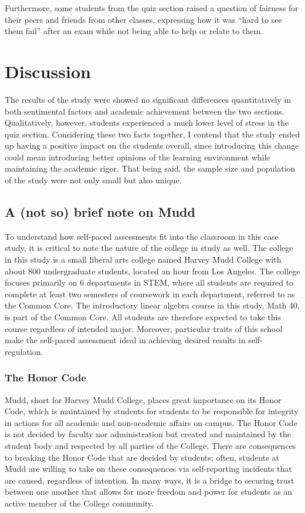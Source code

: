 Furthermore, some students from the quiz section raised a question of fairness for their peers and friends from other classes, expressing how it was ``hard to see them fail'' after an exam while not being able to help or relate to them.

\section{Discussion}

The results of the study were showed no significant differences quantitatively in both sentimental factors and academic achievement between the two sections. Qualitatively, however, students experienced a much lower level of stress in the quiz section. Considering these two facts together, I contend that the study ended up having a positive impact on the students overall, since introducing this change could mean introducing better opinions of the learning environment while maintaining the academic rigor. That being said, the sample size and population of the study were not only small but also unique.

\subsection{A (not so) brief note on Mudd}
To understand how self-paced assessments fit into the classroom in this case study, it is critical to note the nature of the college in study as well. The college in this study is a small liberal arts college named Harvey Mudd College with about 800 undergraduate students, located an hour from Los Angeles. The college focuses primarily on 6 departments in STEM, where all students are required to complete at least two semesters of coursework in each department, referred to as the Common Core. The introductory linear algebra course in this study, Math 40, is part of the Common Core. All students are therefore expected to take this course regardless of intended major. Moreover, particular traits of this school make the self-paced assessment ideal in achieving desired results in self-regulation.

\subsubsection{The Honor Code}
Mudd, short for Harvey Mudd College, places great importance on its Honor Code, which is maintained by students for students to be responsible for integrity in actions for all academic and non-academic affairs on campus. The Honor Code is not decided by faculty nor administration but created and maintained by the student body and respected by all parties of the College. There are consequences to breaking the Honor Code that are decided by students; often, students at Mudd are willing to take on these consequences via self-reporting incidents that are caused, regardless of intention. In many ways, it is a bridge to securing trust between one another that allows for more freedom and power for students as an active member of the College community.

